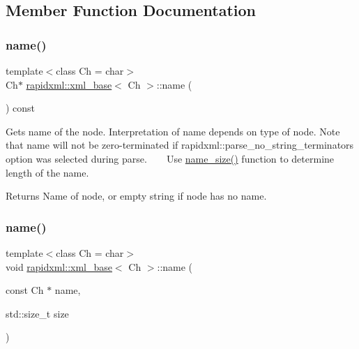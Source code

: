 \subsection{Member Function Documentation}
\mbox{\label{classrapidxml_1_1xml__base_aef8ae147fbee59209f714274afc80dc4}} 
\subsubsection{\texorpdfstring{name()}{name()}\hspace{0.1cm}{\footnotesize\ttfamily [1/3]}}
{\footnotesize\ttfamily template$<$class Ch  = char$>$ \\
Ch$\ast$ \hyperlink{classrapidxml_1_1xml__base}{rapidxml\+::xml\+\_\+base}$<$ Ch $>$\+::name (\begin{DoxyParamCaption}{ }\end{DoxyParamCaption}) const\hspace{0.3cm}{\ttfamily [inline]}}

Gets name of the node. Interpretation of name depends on type of node. Note that name will not be zero-\/terminated if rapidxml\+::parse\+\_\+no\+\_\+string\+\_\+terminators option was selected during parse. ~\newline
~\newline
 Use \hyperlink{classrapidxml_1_1xml__base_a20c8ffbe0c7a0b4231681ab8b99330a4}{name\+\_\+size()} function to determine length of the name. \begin{DoxyReturn}{Returns}
Name of node, or empty string if node has no name. 
\end{DoxyReturn}
\mbox{\label{classrapidxml_1_1xml__base_ae55060ae958c6e6465d6c8db852ec6ce}} 
\subsubsection{\texorpdfstring{name()}{name()}\hspace{0.1cm}{\footnotesize\ttfamily [2/3]}}
{\footnotesize\ttfamily template$<$class Ch  = char$>$ \\
void \hyperlink{classrapidxml_1_1xml__base}{rapidxml\+::xml\+\_\+base}$<$ Ch $>$\+::name (\begin{DoxyParamCaption}\item[{const Ch $\ast$}]{name,  }\item[{std\+::size\+\_\+t}]{size }\end{DoxyParamCaption})\hspace{0.3cm}{\ttfamily [inline]}}

